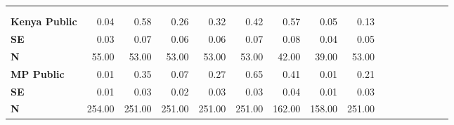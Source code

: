 \begin{tabular}{@{\extracolsep{5pt}}lrrrrrrrrrrrrrrr}
\toprule
&  &  &  &  &  &  &  &  \\
{\bf } &  &  &  &  &  &  &  &  \\
\hline
{\bf Kenya Public} & 0.04\phantom{***} & 0.58\phantom{***} & 0.26\phantom{***} & 0.32\phantom{***} & 0.42\phantom{***} & 0.57\phantom{***} & 0.05\phantom{***} & 0.13\phantom{***} \\
{\bf SE} & 0.03\phantom{***} & 0.07\phantom{***} & 0.06\phantom{***} & 0.06\phantom{***} & 0.07\phantom{***} & 0.08\phantom{***} & 0.04\phantom{***} & 0.05\phantom{***} \\
{\bf N} & 55.00\phantom{***} & 53.00\phantom{***} & 53.00\phantom{***} & 53.00\phantom{***} & 53.00\phantom{***} & 42.00\phantom{***} & 39.00\phantom{***} & 53.00\phantom{***} \\
{\bf MP Public} & 0.01\phantom{***} & 0.35\phantom{***} & 0.07\phantom{***} & 0.27\phantom{***} & 0.65\phantom{***} & 0.41\phantom{***} & 0.01\phantom{***} & 0.21\phantom{***} \\
{\bf SE} & 0.01\phantom{***} & 0.03\phantom{***} & 0.02\phantom{***} & 0.03\phantom{***} & 0.03\phantom{***} & 0.04\phantom{***} & 0.01\phantom{***} & 0.03\phantom{***} \\
{\bf N} & 254.00\phantom{***} & 251.00\phantom{***} & 251.00\phantom{***} & 251.00\phantom{***} & 251.00\phantom{***} & 162.00\phantom{***} & 158.00\phantom{***} & 251.00\phantom{***} \\
\hline
\end{tabular}
